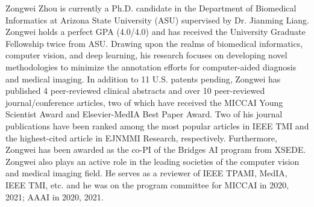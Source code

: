 Zongwei Zhou is currently a Ph.D. candidate in the Department of Biomedical Informatics at Arizona State University (ASU) supervised by Dr. Jianming Liang. Zongwei holds a perfect GPA (4.0/4.0) and has received the University Graduate Fellowship twice from ASU. Drawing upon the realms of biomedical informatics, computer vision, and deep learning, his research focuses on developing novel methodologies to minimize the annotation efforts for computer-aided diagnosis and medical imaging. In addition to 11 U.S. patents pending, Zongwei has published 4 peer-reviewed clinical abstracts and over 10 peer-reviewed journal/conference articles, two of which have received the MICCAI Young Scientist Award and Elsevier-MedIA Best Paper Award. Two of his journal publications have been ranked among the most popular articles in IEEE TMI and the highest-cited article in EJNMMI Research, respectively. Furthermore, Zongwei has been awarded as the co-PI of the Bridges AI program from XSEDE. Zongwei also plays an active role in the leading societies of the computer vision and medical imaging field. He serves as a reviewer of IEEE TPAMI, MedIA, IEEE TMI, etc. and he was on the program committee for MICCAI in 2020, 2021; AAAI in 2020, 2021.